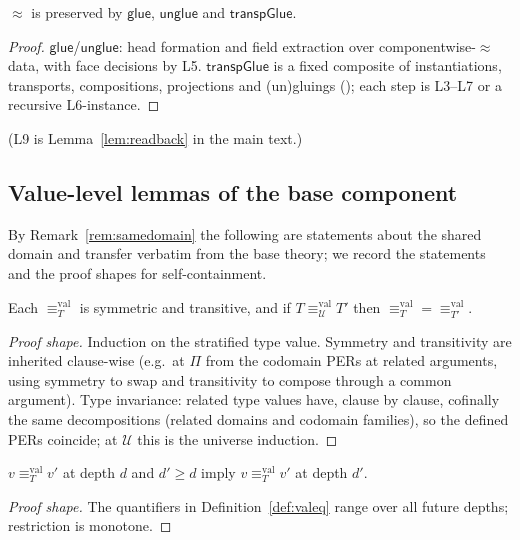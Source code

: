 \documentclass{lmcs}
\newcommand{\Glue}{\mathsf{Glue}}
\newcommand{\glue}{\mathsf{glue}}
\newcommand{\unglue}{\mathsf{unglue}}
\newcommand{\repeq}{\approx}
\newcommand{\valeq}{\equiv^{\mathrm{val}}}
\newcommand{\U}{\mathcal{U}}
\begin{document}
\begin{lem}[L8: $\Glue$ operations (new)]\label{lem:L8}
  $\repeq$ is preserved by $\glue$, $\unglue$ and
  $\mathsf{transpGlue}$.
\end{lem}
\begin{proof}
  $\glue$/$\unglue$: head formation and field extraction over
  componentwise-$\repeq$ data, with face decisions by L5.
  $\mathsf{transpGlue}$ is a fixed composite of instantiations,
  transports, compositions, projections and (un)gluings
  (\cite[\S6.2]{CCHM}); each step is L3--L7 or a recursive
  L6-instance.
\end{proof}

\noindent (L9 is Lemma~\ref{lem:readback} in the main text.)

\subsection{Value-level lemmas of the base component}
\label{app:valuelemmas}

By Remark~\ref{rem:samedomain} the following are statements about the
shared domain and transfer verbatim from the base theory; we record
the statements and the proof shapes for self-containment.

\begin{lem}\label{lem:L10}
  Each $\valeq_T$ is symmetric and transitive, and if
  $T \valeq_{\U} T'$ then $\valeq_T = \valeq_{T'}$.
\end{lem}
\begin{proof}[Proof shape]
  Induction on the stratified type value.  Symmetry and transitivity
  are inherited clause-wise (e.g.\ at $\Pi$ from the codomain PERs at
  related arguments, using symmetry to swap and transitivity to
  compose through a common argument).  Type invariance: related type
  values have, clause by clause, cofinally the same decompositions
  (related domains and codomain families), so the defined PERs
  coincide; at $\U$ this is the universe induction.
\end{proof}

\begin{lem}\label{lem:L11}
  $v \valeq_T v'$ at depth $d$ and $d' \ge d$ imply
  $v \valeq_T v'$ at depth $d'$.
\end{lem}
\begin{proof}[Proof shape]
  The quantifiers in Definition~\ref{def:valeq} range over all future
  depths; restriction is monotone.
\end{proof}
\end{document}
